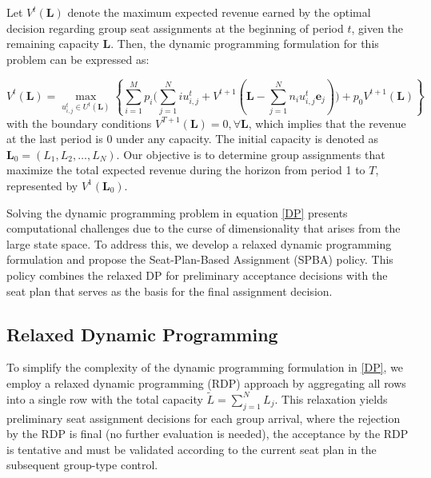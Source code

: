 Let $V^{t}(\mathbf{L})$ denote the maximum expected revenue earned by the optimal decision regarding group seat assignments at the beginning of period $t$, given the remaining capacity $\mathbf{L}$. Then, the dynamic programming formulation for this problem can be expressed as:

\begin{equation}\label{DP}
V^{t}(\mathbf{L}) = \max_{u_{i,j}^{t} \in U^{t}(\mathbf{L})}\left\{\sum_{i=1}^{M} p_i \bigl( \sum_{j=1}^{N} i u_{i,j}^{t} + V^{t+1}(\mathbf{L} - \sum_{j=1}^{N} n_i u_{i,j}^{t}\mathbf{e}_j)\bigr) + p_0 V^{t+1}(\mathbf{L})\right\}
\end{equation}
with the boundary conditions $V^{T+1}(\mathbf{L}) = 0, \forall \mathbf{L}$, which implies that the revenue at the last period is 0 under any capacity. The initial capacity is denoted as $\mathbf{L}_{0} = (L_1, L_2, \ldots, L_N)$. Our objective is to determine group assignments that maximize the total expected revenue during the horizon from period 1 to $T$, represented by $V^{1}(\mathbf{L}_{0})$.


Solving the dynamic programming problem in equation \eqref{DP} presents computational challenges due to the curse of dimensionality that arises from the large state space. To address this, we develop a relaxed dynamic programming formulation and propose the Seat-Plan-Based Assignment (SPBA) policy. This policy combines the relaxed DP for preliminary acceptance decisions with the seat plan that serves as the basis for the final assignment decision.



\subsection{Relaxed Dynamic Programming}
To simplify the complexity of the dynamic programming formulation in \eqref{DP}, we employ a relaxed dynamic programming (RDP) approach by aggregating all rows into a single row with the total capacity $\tilde{L} = \sum_{j=1}^{N} L_j$. This relaxation yields preliminary seat assignment decisions for each group arrival, where the rejection by the RDP is final (no further evaluation is needed), the acceptance by the RDP is tentative and must be validated according to the current seat plan in the subsequent group-type control.

